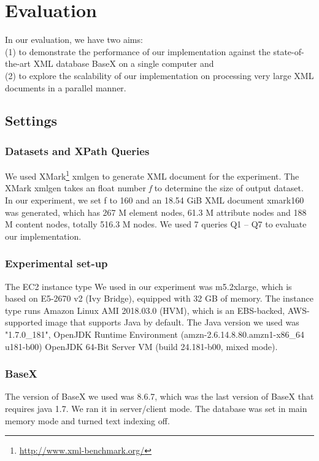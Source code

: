 \section{Evaluation}
\label{sec:evaluation}

In our evaluation, we have two aims:\\
(1) to demonstrate the performance of our implementation against the 
state-of-the-art XML database BaseX on a single computer and \\ 
(2) to explore the scalability of our implementation on processing 
very large XML documents in a parallel manner.

\subsection{Settings}

\subsubsection{Datasets and XPath Queries} 

We used XMark\footnote{\url{http://www.xml-benchmark.org/}} xmlgen to
generate XML document for the experiment. The XMark xmlgen takes an
float number \emph{f} to determine the size of output dataset. In our
experiment, we set f to 160 and an 18.54 GiB XML document xmark160 was
generated, which has 267 M element nodes, 61.3 M attribute nodes and
188 M content nodes, totally 516.3 M nodes. We used 7 queries Q1 -- Q7
to evaluate our implementation. 

\subsubsection{Experimental set-up} 

The EC2 instance type We used in our experiment was m5.2xlarge, which
is based on E5-2670 v2 (Ivy Bridge), equipped with 32 GB of memory.
The instance type runs Amazon Linux AMI 2018.03.0 (HVM), which is an
EBS-backed, AWS-supported image that supports Java by default.  The
Java version we used was "1.7.0\_181",  OpenJDK Runtime Environment
(amzn-2.6.14.8.80.amzn1-x86\_64 u181-b00) OpenJDK 64-Bit Server VM
(build 24.181-b00, mixed mode).

\subsubsection{BaseX}

The version of BaseX we used was 8.6.7, which was the last version of
BaseX that requires java 1.7. We ran it in server/client mode. The
database was set in main memory mode and turned text indexing off. 


